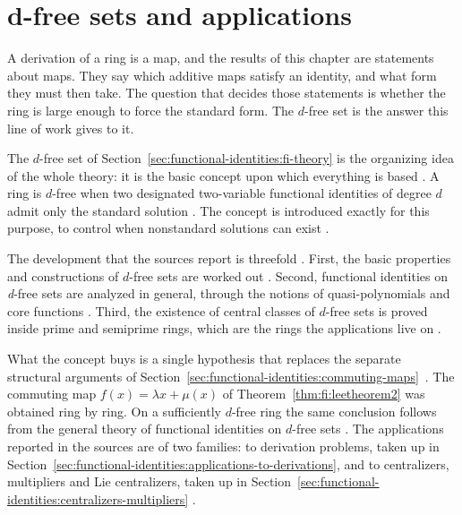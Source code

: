 \section{d-free sets and applications}\label{sec:functional-identities:d-free}

A derivation of a ring is a map, and the results of this chapter are
statements about maps. They say which additive maps satisfy an identity, and
what
form they must then take. The question that decides those statements is
whether the ring is large enough to force the standard form. The
$d$-free set is the answer this line of work gives to it.

The $d$-free set of
Section~\ref{sec:functional-identities:fi-theory} is the organizing idea
of the whole theory: it is the basic concept upon which everything is
based \cite[p.~x]{BresarMartindaleChebotar2007FI}. A ring is $d$-free when
two designated two-variable functional identities of degree $d$ admit only
the standard solution \cite[p.~21]{BresarMartindaleChebotar2007FI}. The
concept is introduced exactly for this purpose, to control when
nonstandard solutions can exist
\cite[p.~21]{BresarMartindaleChebotar2007FI}.

The development that the sources report is threefold
\cite[p.~x]{BresarMartindaleChebotar2007FI}. First, the basic properties
and constructions of $d$-free sets are worked out
\cite[p.~x]{BresarMartindaleChebotar2007FI}. Second, functional
identities on \emph{d}-free sets are analyzed in general, through the
notions of quasi-polynomials and core functions
\cite[p.~x]{BresarMartindaleChebotar2007FI}. Third, the existence of
central classes of $d$-free sets is proved inside prime and semiprime
rings, which are the rings the applications live on
\cite[p.~x]{BresarMartindaleChebotar2007FI}.

What the concept buys is a single hypothesis that replaces the separate
structural arguments of
Section~\ref{sec:functional-identities:commuting-maps}~\cite[p.~x]{BresarMartindaleChebotar2007FI}. The commuting map
$f(x)=\lambda x+\mu(x)$ of Theorem~\ref{thm:fi:leetheorem2} was obtained
ring by ring. On a sufficiently $d$-free ring the same conclusion follows
from the general theory of functional identities on $d$-free sets
\cite[p.~x]{BresarMartindaleChebotar2007FI}. The applications reported in
the sources are of two families: to derivation problems, taken up in
Section~\ref{sec:functional-identities:applications-to-derivations}, and
to centralizers, multipliers and Lie centralizers, taken up in
Section~\ref{sec:functional-identities:centralizers-multipliers}
\cite[p.~x]{BresarMartindaleChebotar2007FI}.
